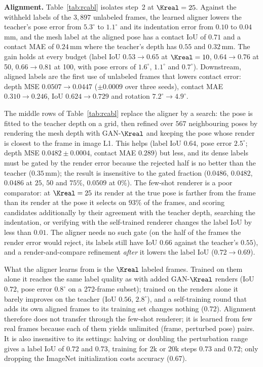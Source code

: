 \noindent\textbf{Alignment.} Table~\ref{tab:rcabl} isolates step~2 at $\Kreal=25$. Against the withheld labels of the $3{,}897$ unlabeled frames, the learned aligner lowers the teacher's pose error from $5.3^\circ$ to $1.1^\circ$ and its indentation error from $0.10$ to $0.04\,$mm, and the mesh label at the aligned pose has a contact IoU of $0.71$ and a contact MAE of $0.24\,$mm where the teacher's depth has $0.55$ and $0.32\,$mm. The gain holds at every budget (label IoU $0.53\!\to\!0.65$ at $\Kreal=10$, $0.64\!\to\!0.76$ at 50, $0.66\!\to\!0.81$ at 100, with pose errors of $1.6^\circ$, $1.1^\circ$ and $0.7^\circ$). Downstream, aligned labels are the first use of unlabeled frames that lowers contact error: depth MSE $0.0507\!\to\!0.0447$ ($\pm0.0009$ over three seeds), contact MAE $0.310\!\to\!0.246$, IoU $0.624\!\to\!0.729$ and rotation $7.2^\circ\!\to\!4.9^\circ$.

The middle rows of Table~\ref{tab:rcabl} replace the aligner by a search: the pose is fitted to the teacher depth on a grid, then refined over $567$ neighbouring poses by rendering the mesh depth with GAN-$\Kreal$ and keeping the pose whose render is closest to the frame in image L1. This helps (label IoU $0.64$, pose error $2.5^\circ$; depth MSE $0.0482\pm0.0004$, contact MAE $0.289$) but less, and its dense labels must be gated by the render error because the rejected half is no better than the teacher ($0.35\,$mm); the result is insensitive to the gated fraction ($0.0486$, $0.0482$, $0.0486$ at $25$, $50$ and $75\%$, $0.0509$ at $0\%$). The few-shot renderer is a poor comparator: at $\Kreal=25$ its render at the true pose is farther from the frame than its render at the pose it selects on $93\%$ of the frames, and scoring candidates additionally by their agreement with the teacher depth, searching the indentation, or verifying with the self-trained renderer changes the label IoU by less than $0.01$. The aligner needs no such gate (on the half of the frames the render error would reject, its labels still have IoU $0.66$ against the teacher's $0.55$), and a render-and-compare refinement \emph{after} it lowers the label IoU ($0.72\!\to\!0.69$).

What the aligner learns from is the $\Kreal$ labeled frames. Trained on them alone it reaches the same label quality as with added GAN-$\Kreal$ renders (IoU $0.72$, pose error $0.8^\circ$ on a 272-frame subset); trained on the renders alone it barely improves on the teacher (IoU $0.56$, $2.8^\circ$), and a self-training round that adds its own aligned frames to its training set changes nothing ($0.72$). Alignment therefore does not transfer through the few-shot renderer; it is learned from few real frames because each of them yields unlimited (frame, perturbed pose) pairs. It is also insensitive to its settings: halving or doubling the perturbation range gives a label IoU of $0.72$ and $0.73$, training for 2k or 20k steps $0.73$ and $0.72$; only dropping the ImageNet initialization costs accuracy ($0.67$).

